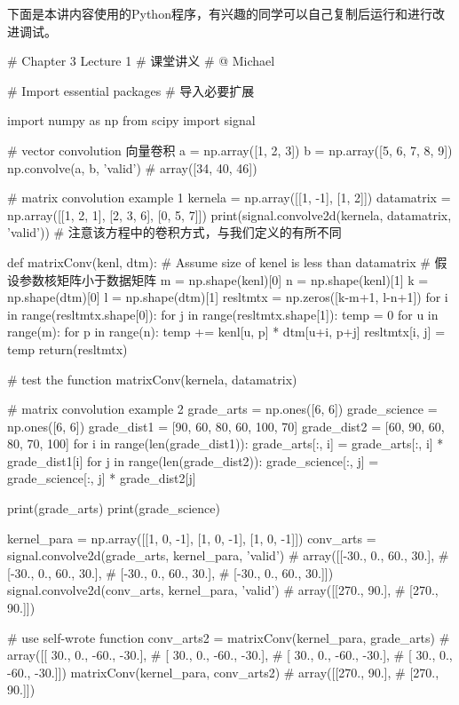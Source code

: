 \documentclass[12pt]{article}
\numberwithin{equation}{section}
\numberwithin{figure}{section}
\begin{document}
\noindent
下面是本讲内容使用的Python程序，有兴趣的同学可以自己复制后运行和进行改进调试。
\begin{python}
# Chapter 3 Lecture 1
# 课堂讲义
# @ Michael

# Import essential packages
# 导入必要扩展

import numpy as np
from scipy import signal

# vector convolution 向量卷积
a = np.array([1, 2, 3])
b = np.array([5, 6, 7, 8, 9])
np.convolve(a, b, 'valid')  # array([34, 40, 46])

# matrix convolution example 1
kernela = np.array([[1, -1], [1, 2]])
datamatrix = np.array([[1, 2, 1], [2, 3, 6], [0, 5, 7]])
print(signal.convolve2d(kernela, datamatrix, 'valid'))
# 注意该方程中的卷积方式，与我们定义的有所不同


def matrixConv(kenl, dtm):
    # Assume size of kenel is less than datamatrix
    # 假设参数核矩阵小于数据矩阵
    m = np.shape(kenl)[0]
    n = np.shape(kenl)[1]
    k = np.shape(dtm)[0]
    l = np.shape(dtm)[1]
    resltmtx = np.zeros([k-m+1, l-n+1])
    for i in range(resltmtx.shape[0]):
        for j in range(resltmtx.shape[1]):
            temp = 0
            for u in range(m):
                for p in range(n):
                    temp += kenl[u, p] * dtm[u+i, p+j]
                    resltmtx[i, j] = temp
    return(resltmtx)


# test the function
matrixConv(kernela, datamatrix)


# matrix convolution example 2
grade_arts = np.ones([6, 6])
grade_science = np.ones([6, 6])
grade_dist1 = [90, 60, 80, 60, 100, 70]
grade_dist2 = [60, 90, 60, 80, 70, 100]
for i in range(len(grade_dist1)):
    grade_arts[:, i] = grade_arts[:, i] * grade_dist1[i]
for j in range(len(grade_dist2)):
    grade_science[:, j] = grade_science[:, j] * grade_dist2[j]

print(grade_arts)
print(grade_science)

kernel_para = np.array([[1, 0, -1], [1, 0, -1], [1, 0, -1]])
conv_arts = signal.convolve2d(grade_arts, kernel_para, 'valid')
# array([[-30.,   0.,  60.,  30.],
#        [-30.,   0.,  60.,  30.],
#        [-30.,   0.,  60.,  30.],
#        [-30.,   0.,  60.,  30.]])
signal.convolve2d(conv_arts, kernel_para, 'valid')
# array([[270.,  90.],
#        [270.,  90.]])

# use self-wrote function
conv_arts2 = matrixConv(kernel_para, grade_arts)
# array([[ 30.,   0., -60., -30.],
#        [ 30.,   0., -60., -30.],
#        [ 30.,   0., -60., -30.],
#        [ 30.,   0., -60., -30.]])
matrixConv(kernel_para, conv_arts2)
# array([[270.,  90.],
#        [270.,  90.]])



\end{python}
\end{document}
